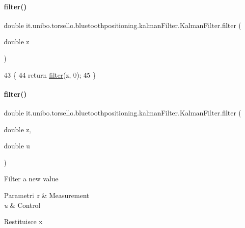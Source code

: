 \paragraph{\texorpdfstring{filter()}{filter()}\hspace{0.1cm}{\footnotesize\ttfamily [1/2]}}
{\footnotesize\ttfamily double it.\+unibo.\+torsello.\+bluetoothpositioning.\+kalman\+Filter.\+Kalman\+Filter.\+filter (\begin{DoxyParamCaption}\item[{double}]{z }\end{DoxyParamCaption})}


\begin{DoxyCode}
43                                    \{
44         \textcolor{keywordflow}{return} \hyperlink{classit_1_1unibo_1_1torsello_1_1bluetoothpositioning_1_1kalmanFilter_1_1KalmanFilter_add00ee8814dc3f7692db79ecb18b030c_add00ee8814dc3f7692db79ecb18b030c}{filter}(z, 0);
45     \}
\end{DoxyCode}
\hypertarget{classit_1_1unibo_1_1torsello_1_1bluetoothpositioning_1_1kalmanFilter_1_1KalmanFilter_ab50a6f6e395f63d2b581fbcbf3742c57_ab50a6f6e395f63d2b581fbcbf3742c57}{}\label{classit_1_1unibo_1_1torsello_1_1bluetoothpositioning_1_1kalmanFilter_1_1KalmanFilter_ab50a6f6e395f63d2b581fbcbf3742c57_ab50a6f6e395f63d2b581fbcbf3742c57} 
\paragraph{\texorpdfstring{filter()}{filter()}\hspace{0.1cm}{\footnotesize\ttfamily [2/2]}}
{\footnotesize\ttfamily double it.\+unibo.\+torsello.\+bluetoothpositioning.\+kalman\+Filter.\+Kalman\+Filter.\+filter (\begin{DoxyParamCaption}\item[{double}]{z,  }\item[{double}]{u }\end{DoxyParamCaption})}

Filter a new value


\begin{DoxyParams}{Parametri}
{\em z} & Measurement \\
\hline
{\em u} & Control \\
\hline
\end{DoxyParams}
\begin{DoxyReturn}{Restituisce}
x 
\end{DoxyReturn}

